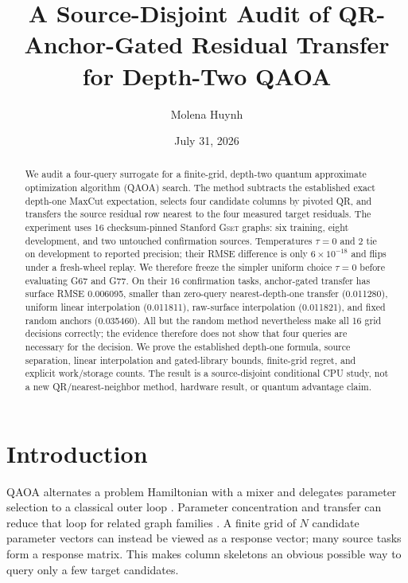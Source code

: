 \documentclass[10pt,letterpaper,twoside]{article}
\newcommand{\dataset}{\textsc{Gset}}
\begin{document}
\title{A Source-Disjoint Audit of QR-Anchor-Gated Residual Transfer for
Depth-Two QAOA}

\author{Molena Huynh}

\date{July 31, 2026}

\maketitle

\begin{abstract}
We audit a four-query surrogate for a finite-grid, depth-two quantum
approximate optimization algorithm (QAOA) search.  The method subtracts the
established exact depth-one MaxCut expectation, selects four candidate columns
by pivoted QR, and transfers the source residual row nearest to the four
measured target residuals.  The experiment uses 16 checksum-pinned Stanford
\dataset{} graphs: six training, eight development, and two untouched
confirmation sources.  Temperatures $\tau=0$ and $2$ tie on development to
reported precision; their RMSE difference is only $6\times10^{-18}$ and flips
under a fresh-wheel replay.  We therefore freeze the simpler uniform choice
$\tau=0$ before evaluating G67 and G77.  On their 16 confirmation tasks,
anchor-gated transfer has surface RMSE 0.006095, smaller than zero-query
nearest-depth-one transfer (0.011280), uniform linear interpolation (0.011811),
raw-surface interpolation (0.011821), and fixed random anchors (0.035460).
All but the random method nevertheless make all 16 grid decisions correctly;
the evidence therefore does not show that four queries are necessary for the
decision.  We prove the established depth-one formula, source separation,
linear interpolation and gated-library bounds, finite-grid regret, and
explicit work/storage counts.  The result is a source-disjoint conditional
CPU study, not a new QR/nearest-neighbor method, hardware result, or quantum
advantage claim.
\end{abstract}


\section{Introduction}

QAOA alternates a problem Hamiltonian with a mixer and delegates parameter
selection to a classical outer loop \cite{farhi2014qaoa}.  Parameter
concentration and transfer can reduce that loop for related graph families
\cite{brandao2018concentration,shaydulin2023weighted}.  A finite grid of
$N$ candidate parameter vectors can instead be viewed as a response vector;
many source tasks form a response matrix.  This makes column skeletons an
obvious possible way to query only a few target candidates.
\end{document}
